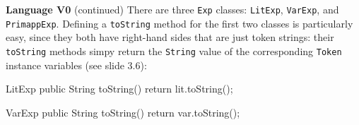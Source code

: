 \begin{minipage}[t]{\sw}
\slidenumber
\LARGE
{\bf Language V0} (continued)\exx
There are three \verb'Exp' classes:
\verb'LitExp', \verb'VarExp', and \verb'PrimappExp'.
Defining a \verb'toString' method
for the first two classes is particularly easy,
since they both have right-hand sides
that are just token strings:
their \verb'toString' methods simpy return
the \verb'String' value of the corresponding \verb'Token' instance variables
(see slide 3.6):
\begin{qv}
LitExp
    public String toString() {
        return lit.toString();
    }

VarExp
    public String toString() {
        return var.toString();
    }
\end{qv}
\end{minipage}
